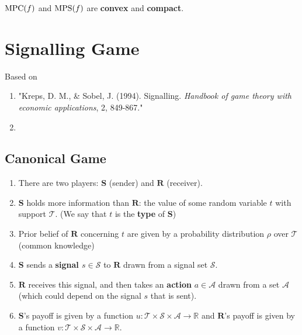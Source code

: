 \documentclass[11pt]{elegantbook}
\begin{document}
\begin{corollary}
    $\textnormal{MPC}(f)$ and $\textnormal{MPS}(f)$ are \textbf{convex} and \textbf{compact}.
\end{corollary}




\chapter{Signalling Game}
Based on
\begin{enumerate}[$\circ$]
    \item "Kreps, D. M., \& Sobel, J. (1994). Signalling. \textit{Handbook of game theory with economic applications}, 2, 849-867."
    \item 
\end{enumerate}

\section{Canonical Game}
\begin{definition}
    \normalfont
    \begin{enumerate}
        \item There are two players: $\mathbf{S}$ (sender) and $\mathbf{R}$ (receiver).
        \item $\mathbf{S}$ holds more information than $\mathbf{R}$: the value of some random variable $t$ with support $\mathcal{T}$. (We say that $t$ is the \textbf{type} of $\mathbf{S}$)
        \item Prior belief of $\mathbf{R}$ concerning $t$ are given by a probability distribution $\rho$ over $\mathcal{T}$ (common knowledge)
        \item $\mathbf{S}$ sends a \textbf{signal $s\in \mathcal{S}$} to $\mathbf{R}$ drawn from a signal set $\mathcal{S}$.
        \item $\mathbf{R}$ receives this signal, and then takes an \textbf{action} $a\in \mathcal{A}$ drawn from a set $\mathcal{A}$ (which could depend on the signal $s$ that is sent).
        \item $\mathbf{S}$'s payoff is given by a function $u: \mathcal{T}\times \mathcal{S} \times \mathcal{A} \rightarrow \mathbb{R}$ and $\mathbf{R}$'s payoff is given by a function $v: \mathcal{T}\times \mathcal{S} \times \mathcal{A} \rightarrow \mathbb{R}$.
    \end{enumerate}
\end{definition}
\end{document}
